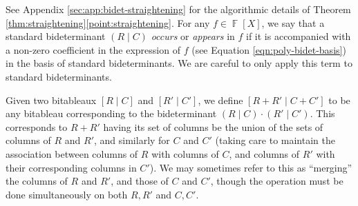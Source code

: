 \documentclass[11pt,reqno]{amsart}
\DeclareMathOperator{\F}{\mathbb{F}}
\newcommand{\bitab}[2]{[#1\;|\;#2]}
\newcommand{\bidet}[2]{(#1\;|\;#2)}
\theoremstyle{definition}
\numberwithin{equation}{section}
\begin{document}
See Appendix \ref{sec:app:bidet-straightening} for the algorithmic details of Theorem \ref{thm:straightening}\ref{point:straightening}. For any $f \in \F[X]$, we say that a standard bideterminant $\bidet{R}{C}$ \emph{occurs} or \emph{appears} in $f$ if it is accompanied with a non-zero coefficient in the expression of $f$ (see Equation \eqref{eqn:poly-bidet-basis}) in the basis of standard bideterminants. We are careful to only apply this term to standard bideterminants.

Given two bitableaux $\bitab{R}{C}$ and $\bitab{R'}{C'}$, we define $\bitab{R + R'}{C + C'}$ to be any bitableau corresponding to the bideterminant $\bidet{R}{C} \cdot \bidet{R'}{C'}$. This corresponds to $R+R'$ having its set of columns be the union of the sets of columns of $R$ and $R'$, and similarly for $C$ and $C'$ (taking care to maintain the association between columns of $R$ with columns of $C$, and columns of $R'$ with their corresponding columns in $C'$). We may sometimes refer to this as ``merging'' the columns of $R$ and $R'$, and those of $C$ and $C'$, though the operation must be done simultaneously on both $R,R'$ and $C,C'$.
\end{document}
